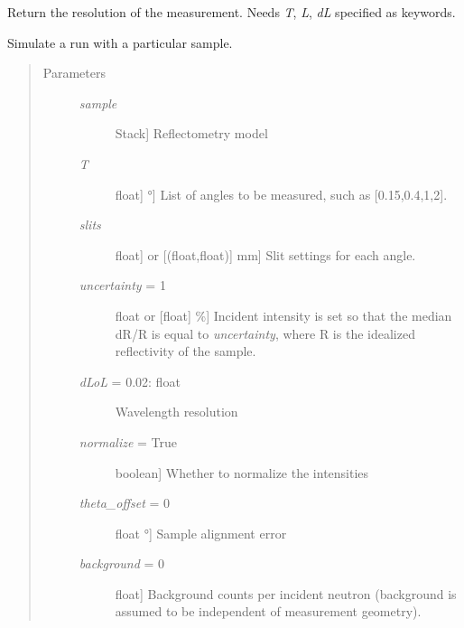 \documentclass[letterpaper,10pt,english]{sphinxmanual}
\begin{document}
\begin{fulllineitems}
\begin{fulllineitems}
\end{fulllineitems}


\begin{fulllineitems}
\label{api/snsdata:refl1d.snsdata.Liquids.resolution}
Return the resolution of the measurement.  Needs \emph{T}, \emph{L}, \emph{dL}
specified as keywords.

\end{fulllineitems}


\begin{fulllineitems}
\label{api/snsdata:refl1d.snsdata.Liquids.simulate}
Simulate a run with a particular sample.
\begin{quote}\begin{description}
\item[{Parameters }] \leavevmode\begin{description}
\item[{\emph{sample}}] \leavevmode{[}Stack{]}
Reflectometry model

\item[{\emph{T}}] \leavevmode{[}{[}float{]} \textbar{} °{]}
List of angles to be measured, such as {[}0.15,0.4,1,2{]}.

\item[{\emph{slits}}] \leavevmode{[}{[}float{]} or {[}(float,float){]} \textbar{} mm{]}
Slit settings for each angle.

\item[{\emph{uncertainty} = 1}] \leavevmode{[}float or {[}float{]} \textbar{} \%{]}
Incident intensity is set so that the median dR/R is equal
to \emph{uncertainty}, where R is the idealized reflectivity
of the sample.

\item[{\emph{dLoL} = 0.02: float}] \leavevmode
Wavelength resolution

\item[{\emph{normalize} = True}] \leavevmode{[}boolean{]}
Whether to normalize the intensities

\item[{\emph{theta\_offset} = 0}] \leavevmode{[}float \textbar{} °{]}
Sample alignment error

\item[{\emph{background} = 0}] \leavevmode{[}float{]}
Background counts per incident neutron (background is
assumed to be independent of measurement geometry).


\end{description}
\end{description}
\end{quote}
\end{fulllineitems}
\end{fulllineitems}
\end{document}
